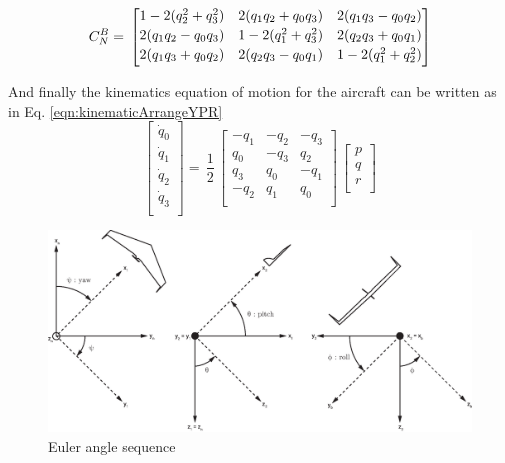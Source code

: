 \begin{equation}{\label{eqn:C_NtoB}}
C_N^B
= \,
\begin{bmatrix}
1 - 2(q_2^2 + q_3^2) & 2(q_1 q_2 + q_0 q_3) & 2(q_1 q_3 - q_0 q_2)  \\[0.2em]
2(q_1 q_2 - q_0 q_3) & 1 - 2(q_1^2 + q_3^2) & 2(q_2 q_3 + q_0 q_1)\\[0.2em]
2(q_1 q_3 + q_0 q_2) & 2(q_2 q_3 - q_0 q_1) & 1 - 2(q_1^2 + q_2^2) \\[0.2em]
\end{bmatrix}
\end{equation}

And finally the kinematics equation of motion for the aircraft can be written as in Eq. \ref{eqn:kinematicArrangeYPR}
\begin{equation} \label{eqn:kinematicArrangeYPR}
\begin{bmatrix}
\dot{q}_0\\[0.2em]
\dot{q}_1\\[0.2em]
\dot{q}_2\\[0.2em]
\dot{q}_3\\[0.2em]
\end{bmatrix}
 =\,
\frac{1}{2}
\,
\begin{bmatrix}
-q_1 & -q_2 & -q_3 \\
q_0 & -q_3 & q_2 \\
q_3 & q_0 & -q_1 \\
-q_2 & q_1 & q_0\\
\end{bmatrix}
\,
\begin{bmatrix}
p\\[0.2em]
q\\[0.2em]
r\\[0.2em]
\end{bmatrix} 
\end{equation}

\begin{landscape}
\begin{figure}
\begin{center}
\includegraphics[width=23cm]{figures/ZagiEulerAngleSequence}
\caption{Euler angle sequence \cite{ducard2009fault}} 
\label{fig:eulerAngSequence}
\end{center}
\end{figure}
\end{landscape}

